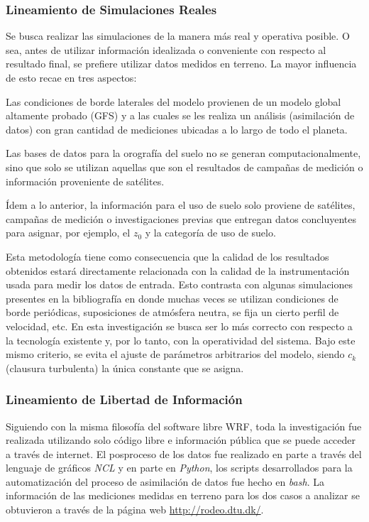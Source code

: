 \subsubsection{Lineamiento de Simulaciones Reales}
Se busca realizar las simulaciones de la manera más real y operativa posible. O sea, antes de utilizar información idealizada o conveniente con respecto al resultado final, se prefiere utilizar datos medidos en terreno. La mayor influencia de esto recae en tres aspectos:
\begin{enumerate*}
	\item Las condiciones de borde laterales del modelo provienen de un modelo global altamente probado (GFS) y a las cuales se les realiza un análisis (asimilación de datos) con  gran cantidad de mediciones ubicadas a lo largo de todo el planeta.
	\item Las bases de datos para la orografía del suelo no se generan computacionalmente, sino que solo se utilizan aquellas que son el resultados de campañas de medición o información proveniente de satélites.
	\item Ídem a lo anterior, la información para el uso de suelo solo proviene de satélites, campañas de medición o investigaciones previas que entregan datos concluyentes para asignar, por ejemplo, el $z_0$ y la categoría de uso de suelo.
\end{enumerate*}
Esta metodología tiene como consecuencia que la calidad de los resultados obtenidos estará directamente relacionada con la calidad de la instrumentación usada para medir los datos de entrada. Esto contrasta con algunas simulaciones presentes en la bibliografía en donde muchas veces se utilizan condiciones de borde periódicas, suposiciones de atmósfera neutra, se fija un cierto perfil de velocidad, etc. En esta investigación se busca ser lo más correcto con respecto a la tecnología existente y, por lo tanto, con la operatividad del sistema. Bajo este mismo criterio, se evita el ajuste de parámetros arbitrarios del modelo, siendo $c_k$ (clausura turbulenta) la única constante que se asigna.
\subsubsection{Lineamiento de Libertad de Información}
Siguiendo con la misma filosofía del software libre WRF, toda la investigación fue realizada utilizando solo código libre e información pública que se puede acceder a través de internet. El posproceso de los datos fue realizado en parte a través del lenguaje de gráficos \emph{NCL} y en parte en \emph{Python}, los scripts desarrollados para la automatización del proceso de asimilación de datos fue hecho en \emph{bash}. La información de las mediciones medidas en terreno para los dos casos a analizar se obtuvieron a través de la página web \url{http://rodeo.dtu.dk/}.
